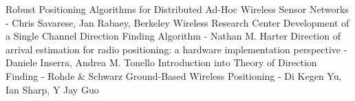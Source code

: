\begin{thebibliography}{10}
 Robust Positioning Algorithms for Distributed Ad-Hoc Wireless Sensor Networks - 
Chris Savarese, Jan Rabaey, 
Berkeley Wireless Research Center 
 Development of a Single Channel Direction Finding Algorithm - 
Nathan M. Harter
 Direction of arrival estimation for radio positioning:
a hardware implementation perspective - 
Daniele Inserra, Andrea M. Tonello
 Introduction into Theory of Direction Finding - Rohde & Schwarz
\bibitem Ground-Based Wireless Positioning - Di Kegen Yu, Ian Sharp, Y Jay Guo
\end{thebibliography}

